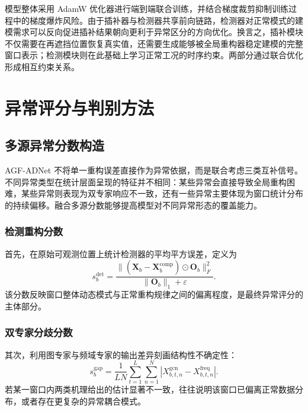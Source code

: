 \documentclass[bachelor, vlined]{DissertUESTC}
\begin{document}
    模型整体采用 AdamW 优化器进行端到端联合训练，并结合梯度裁剪抑制训练过程中的梯度爆炸风险。由于插补器与检测器共享前向链路，检测器对正常模式的建模需求可以反向促进插补结果朝向更利于异常区分的方向优化。换言之，插补模块不仅需要在再遮挡位置恢复真实值，还需要生成能够被全局重构器稳定建模的完整窗口表示；检测模块则在此基础上学习正常工况的时序约束。两部分通过联合优化形成相互约束关系。

    \section{异常评分与判别方法}

    \subsection{多源异常分数构造}

    AGF-ADNet 不将单一重构误差直接作为异常依据，而是联合考虑三类互补信号。不同异常类型在统计层面呈现的特征并不相同：某些异常会直接导致全局重构困难，某些异常则表现为双专家响应不一致，还有一些异常主要体现为窗口统计分布的持续偏移。融合多源分数能够提高模型对不同异常形态的覆盖能力。

    \subsubsection{检测重构分数}

    首先，在原始可观测位置上统计检测器的平均平方误差，定义为
    \begin{equation}
        s_b^{\mathrm{det}}
        =
        \frac{\|(\hat{\mathbf{X}}_b-\mathbf{X}_b^{\mathrm{comp}})\odot \mathbf{O}_b\|_F^2}{\|\mathbf{O}_b\|_1 + \varepsilon}.
    \end{equation}
    该分数反映窗口整体动态模式与正常重构规律之间的偏离程度，是最终异常评分的主体部分。

    \subsubsection{双专家分歧分数}

    其次，利用图专家与频域专家的输出差异刻画结构性不确定性：
    \begin{equation}
        s_b^{\mathrm{gap}}
        =
        \frac{1}{LN}
        \sum_{t=1}^{L}\sum_{n=1}^{N}
        \left|
            X_{b,t,n}^{\mathrm{gcn}} - X_{b,t,n}^{\mathrm{freq}}
        \right|.
    \end{equation}
    若某一窗口内两类机理给出的估计显著不一致，往往说明该窗口已偏离正常数据分布，或者存在更复杂的异常耦合模式。
\end{document}
